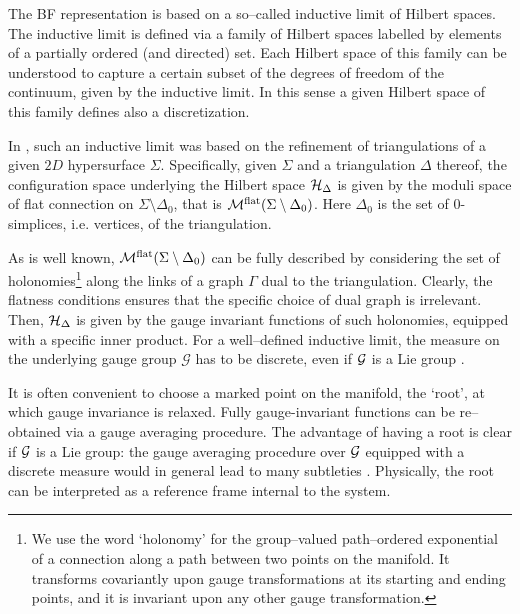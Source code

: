 \documentclass[nofootinbib,superscriptaddress,eqsecnum,tightenlines,11pt]{revtex4-1}
\begin{document}
The BF representation is based on a so--called inductive limit of Hilbert spaces. The inductive limit is defined via a family of Hilbert spaces labelled by elements of a partially ordered (and directed) set. Each Hilbert space of this family can be understood to capture a certain subset of the degrees of freedom of the continuum, given by the inductive limit. In this sense a given Hilbert space of this family defines also a discretization. 

In \cite{DG14a,DG14b,BDG15}, such an inductive limit was based on the refinement of triangulations of a given $2D$ hypersurface $\Sigma$.
Specifically, given $\Sigma$ and a triangulation $\Delta$ thereof, the configuration space underlying the Hilbert space ${\cal H}_\Delta$ is given by the moduli space of flat connection on $\Sigma\setminus\Delta_0$, that is ${\cal M}^\text{flat}(\Sigma\setminus\Delta_0)$.
Here $\Delta_0$ is the set of $0$-simplices, i.e. vertices, of the triangulation.

As is well known, ${\cal M}^\text{flat}(\Sigma\setminus\Delta_0)$ can be fully described by considering the set of holonomies\footnote{We use the word `holonomy' for the group--valued path--ordered exponential of a connection along a path between two points on the manifold. It transforms covariantly upon gauge transformations at its starting and ending points, and it is  invariant upon any other gauge transformation. } along the links of a graph $\Gamma$ dual to the triangulation.
Clearly, the flatness conditions ensures that the specific choice of dual graph is irrelevant.
Then, ${\cal H}_\Delta$ is given by the gauge invariant functions of such holonomies, equipped with a specific inner product.
For a well--defined inductive limit, the measure on the underlying gauge group $\mathcal G$ has to be discrete, even if $\cal G$ is a Lie group \cite{DG14a,BDG15}.

It is often convenient to choose a marked point on the manifold, the `root', at which gauge invariance is relaxed.
Fully gauge-invariant functions can be re--obtained via a gauge averaging procedure.
The advantage of having a root is clear if $\cal G$ is a Lie group: the gauge averaging procedure over $\cal G$ equipped with a discrete measure would in general  lead to many subtleties \cite{BDG15}.
Physically, the root can be interpreted as a reference frame internal to the system. 
\end{document}
